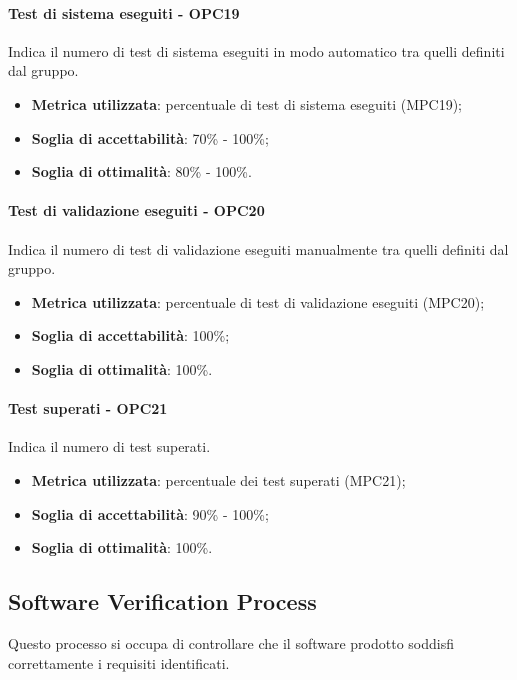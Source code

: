 \documentclass[PdQ.tex]{subfiles}
\begin{document}
			\paragraph{Test di sistema eseguiti - OPC19}
				Indica il numero di test di sistema eseguiti in modo automatico tra quelli definiti dal gruppo.
				\begin{itemize}
					\item \textbf{Metrica utilizzata}: percentuale di test di sistema eseguiti (MPC19);
					\item \textbf{Soglia di accettabilità}: 70\% - 100\%;
					\item \textbf{Soglia di ottimalità}: 80\% - 100\%.
				\end{itemize}
				
			\paragraph{Test di validazione eseguiti - OPC20}
				Indica il numero di test di validazione eseguiti manualmente tra quelli definiti dal gruppo.
				\begin{itemize}
					\item \textbf{Metrica utilizzata}: percentuale di test di validazione eseguiti (MPC20);
					\item \textbf{Soglia di accettabilità}: 100\%;
					\item \textbf{Soglia di ottimalità}: 100\%.
				\end{itemize}
				
			\paragraph{Test superati - OPC21}
				Indica il numero di test superati.
				\begin{itemize}
					\item \textbf{Metrica utilizzata}: percentuale dei test superati (MPC21);
					\item \textbf{Soglia di accettabilità}: 90\% - 100\%;
					\item \textbf{Soglia di ottimalità}: 100\%.
				\end{itemize}
	\subsection{Software Verification Process}
		Questo processo si occupa di controllare che il software prodotto soddisfi correttamente i requisiti identificati.
		
\end{document}
